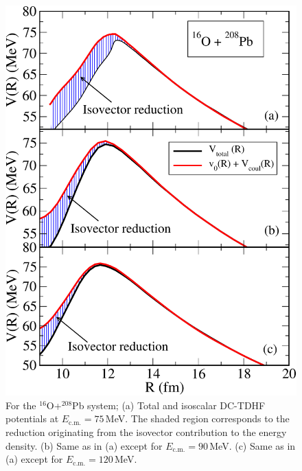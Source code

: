 \begin{figure}
	\includegraphics*[width=\textwidth]{../Figures/Isospin/V_16O_208Pb_ecm75.pdf}
	\caption{For the $^{16}$O+$^{208}$Pb system;
		(a) Total and isoscalar DC-TDHF potentials at $E_\mathrm{c.m.}=75$\,MeV. The shaded
		region corresponds to the reduction originating from the isovector contribution to
		the energy density.
		(b) Same as in (a) except for $E_\mathrm{c.m.}=90$\,MeV.
		(c) Same as in (a) except for $E_\mathrm{c.m.}=120$\,MeV.}
	\label{fig:OPb}
\end{figure}
